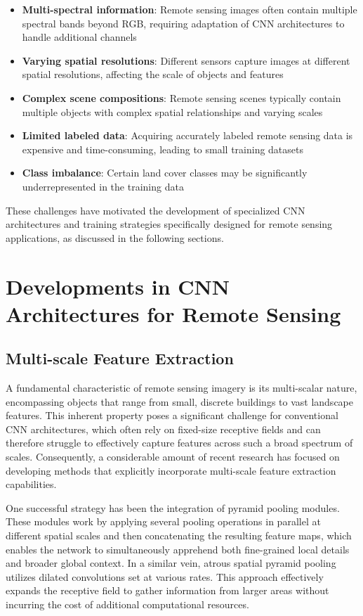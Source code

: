 \documentclass[12pt,a4paper]{article}
\begin{document}
\begin{itemize}
\item \textbf{Multi-spectral information}: Remote sensing images often contain multiple spectral bands beyond RGB, requiring adaptation of CNN architectures to handle additional channels
\item \textbf{Varying spatial resolutions}: Different sensors capture images at different spatial resolutions, affecting the scale of objects and features \cite{cheng2016survey}
\item \textbf{Complex scene compositions}: Remote sensing scenes typically contain multiple objects with complex spatial relationships and varying scales \cite{xia2017aid}
\item \textbf{Limited labeled data}: Acquiring accurately labeled remote sensing data is expensive and time-consuming, leading to small training datasets \cite{zhu2017deep}
\item \textbf{Class imbalance}: Certain land cover classes may be significantly underrepresented in the training data
\end{itemize}

These challenges have motivated the development of specialized CNN architectures and training strategies specifically designed for remote sensing applications, as discussed in the following sections.

\section{Developments in CNN Architectures for Remote Sensing}
\label{sec:developments}

\subsection{Multi-scale Feature Extraction}
A fundamental characteristic of remote sensing imagery is its multi-scalar nature, encompassing objects that range from small, discrete buildings to vast landscape features. This inherent property poses a significant challenge for conventional CNN architectures, which often rely on fixed-size receptive fields and can therefore struggle to effectively capture features across such a broad spectrum of scales. Consequently, a considerable amount of recent research has focused on developing methods that explicitly incorporate multi-scale feature extraction capabilities.

One successful strategy has been the integration of pyramid pooling modules. These modules work by applying several pooling operations in parallel at different spatial scales and then concatenating the resulting feature maps, which enables the network to simultaneously apprehend both fine-grained local details and broader global context. In a similar vein, atrous spatial pyramid pooling utilizes dilated convolutions set at various rates. This approach effectively expands the receptive field to gather information from larger areas without incurring the cost of additional computational resources.
\end{document}
